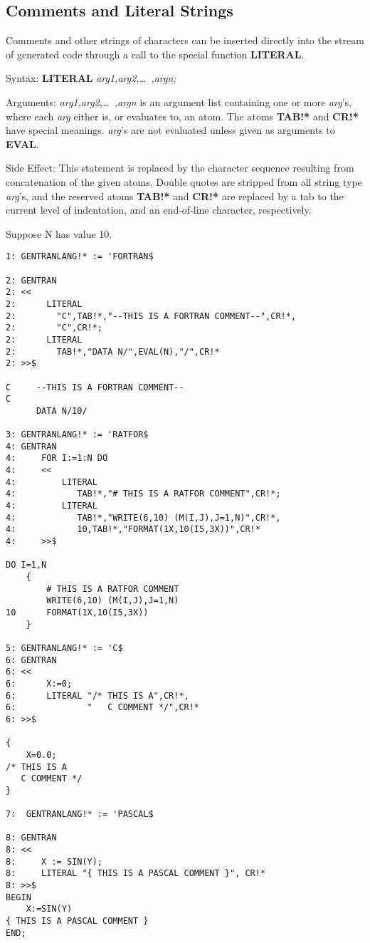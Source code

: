 \subsection{Comments and Literal Strings}
\label{comments} 
Comments and other strings of characters can be inserted directly into
the stream of generated code through a call to the special function
{\bf LITERAL}.
\begin{describe}{Syntax:}
{\bf LITERAL} {\it  arg1,arg2,\dots\  ,argn;}
\end{describe}
\begin{describe}{Arguments:}
{\it arg1,arg2,\dots\  ,argn} is an argument list containing one or more
{\it arg}'s, where each {\it arg} either is, or evaluates to, an atom.  The
 
atoms {\bf TAB!*} and {\bf CR!*} have special meanings.  {\it arg}'s are
not evaluated unless given as arguments to {\bf EVAL}.
\end{describe}
\begin{describe}{Side Effect:}
This statement is replaced by the character sequence resulting from
concatenation of the given atoms.  Double quotes are stripped from
all string type {\it arg}'s, and the reserved atoms {\bf TAB!*} and
{\bf CR!*} are replaced by a tab to the current level of indentation, and
an end-of-line character, respectively.
\end{describe}
\begin{describe}{\example}
Suppose N has value 10.
\begin{verbatim}
1: GENTRANLANG!* := 'FORTRAN$

2: GENTRAN
2: <<
2:      LITERAL
2:        "C",TAB!*,"--THIS IS A FORTRAN COMMENT--",CR!*,
2:        "C",CR!*;
2:      LITERAL
2:        TAB!*,"DATA N/",EVAL(N),"/",CR!*
2: >>$

C     --THIS IS A FORTRAN COMMENT--
C
      DATA N/10/

3: GENTRANLANG!* := 'RATFOR$
4: GENTRAN
4:     FOR I:=1:N DO
4:     <<
4:         LITERAL
4:            TAB!*,"# THIS IS A RATFOR COMMENT",CR!*;
4:         LITERAL
4:            TAB!*,"WRITE(6,10) (M(I,J),J=1,N)",CR!*,
4:            10,TAB!*,"FORMAT(1X,10(I5,3X))",CR!*
4:     >>$

DO I=1,N
    {
        # THIS IS A RATFOR COMMENT
        WRITE(6,10) (M(I,J),J=1,N)
10      FORMAT(1X,10(I5,3X))
    }

5: GENTRANLANG!* := 'C$
6: GENTRAN
6: <<
6:      X:=0;
6:      LITERAL "/* THIS IS A",CR!*,
6:              "   C COMMENT */",CR!*
6: >>$

{
    X=0.0;
/* THIS IS A
   C COMMENT */
}

7:  GENTRANLANG!* := 'PASCAL$

8: GENTRAN
8: <<
8:     X := SIN(Y);
8:     LITERAL "{ THIS IS A PASCAL COMMENT }", CR!*
8: >>$
BEGIN
    X:=SIN(Y)
{ THIS IS A PASCAL COMMENT }
END;

\end{verbatim}
\end{describe}
